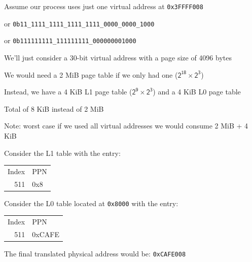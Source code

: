   \begin{slide}


    Assume our process uses just one virtual address at \texttt{0x3FFFF008}

    \leftspace{}or \texttt{0b11\_1111\_1111\_1111\_1111\_0000\_0000\_1000}

    \leftspace{}or \texttt{0b111111111\_111111111\_000000001000}
    \medskip

    We'll just consider a 30-bit virtual address with a page size of 4096 bytes

    \leftspace{}We would need a 2 MiB page table if we only had one
    ($\mathsf{2^{18} \times 2^{3}}$)
    \medskip

    Instead, we have a 4 KiB L1 page table ($\mathsf{2^9 \times 2^{3}}$) and a 4
    KiB L0 page table

    \leftspace{}Total of 8 KiB instead of 2 MiB
    \medskip

    Note: worst case if we used all virtual addresses we would consume 2 MiB + 4
    KiB

  \end{slide}

  \begin{slide}


    Consider the L1 table with the entry:

    \begin{center}
    {\ttfamily
    \begin{tabular}{rl}
      Index & PPN \\
      511   & 0x8 \\
    \end{tabular}}
    \end{center}
    \medskip

    Consider the L0 table located at \texttt{0x8000} with the entry:
    \begin{center}
    {\ttfamily
    \begin{tabular}{rl}
      Index & PPN \\
      511   & 0xCAFE \\
    \end{tabular}}
    \end{center}
    
    The final translated physical address would be: \texttt{0xCAFE008}

  \end{slide}


